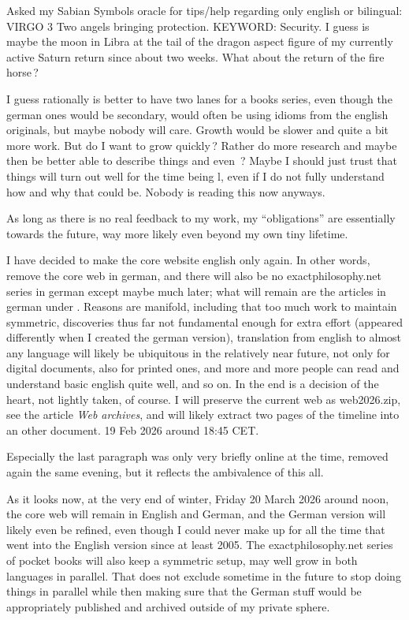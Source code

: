 \begin{itemize}
Asked my Sabian Symbols oracle for tips/help regarding only english or bilingual:
VIRGO 3 Two angels bringing protection.
KEYWORD:  Security.
%
I guess is maybe the moon in Libra
at the tail of the dragon aspect figure
of my currently active Saturn return
since about two weeks.
%
What about the return of the fire horse\,?

I guess rationally is better to have two lanes for a books series,
even though the german ones would be secondary,
would often be using idioms from the english originals,
but maybe nobody will care.
%
Growth would be slower and quite a bit more work.
%
But do I want to grow quickly\,?
%
Rather do more research
and maybe then be better able to describe things
and even \ELEMENTAL\,?
%
Maybe I should just trust that things will turn out well for the time being l,
even if I do not fully understand how and why that could be.
%
Nobody is reading this now anyways.

As long as there is no real feedback to my work,
my “obligations” are essentially towards the future,
way more likely even beyond my own tiny lifetime.

I have decided to make the core website english only again.
%
In other words, remove the core web in german,
and there will also be no {\color{gray}exactphilosophy.net series} in german
except maybe much later;
what will remain are the articles in german under \cometartemis.
%
Reasons are manifold, including that too much work to maintain symmetric,
discoveries thus far not fundamental enough for extra effort
(appeared differently when I created the german version),
translation from english to almost any language will likely be ubiquitous in the relatively near future,
not only for digital documents, also for printed ones,
and more and more people can read and understand basic english quite well,
and so on.
%
In the end is a decision of the heart,
not lightly taken,
of course.
%
I will preserve the current web as web2026.zip,
see the article \textsl{Web archives},
and will likely extract two pages of the timeline into an other document.
%
19 Feb 2026 around 18:45 CET.

\end{itemize}
\normalsize

\noindent
Especially the last paragraph was only very briefly online at the time,
removed again the same evening,
but it reflects the ambivalence of this all.

As it looks now,
at the very end of winter,
Friday 20 March 2026 around noon,
the core web will remain in English and German,
and the German version will likely even be refined,
even though I could never make up for all the time
that went into the English version since at least 2005.
%
The {\color{gray}exactphilosophy.net series} of pocket books
will also keep a symmetric setup,
may well grow in both languages in parallel.
%
That does not exclude sometime in the future to stop doing things in parallel
while then making sure that the German stuff would be appropriately published
and archived outside of my private sphere.

